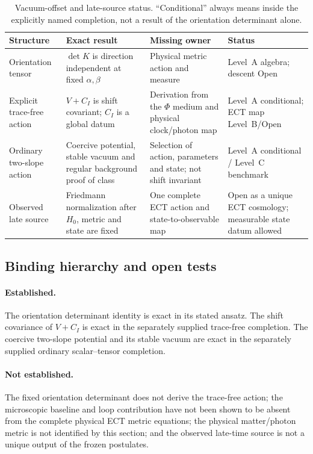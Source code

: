 {\small
\begin{longtable}{p{3.1cm}p{3.7cm}p{3.6cm}p{3.7cm}}
\caption{Vacuum-offset and late-source status.  ``Conditional'' always means
inside the explicitly named completion, not a result of the orientation
determinant alone.}
\label{tab:cc_approaches}\\
\toprule
\textbf{Structure} & \textbf{Exact result} &
\textbf{Missing owner} & \textbf{Status}\\
\midrule
Orientation tensor & $\det K$ is direction independent at fixed
$\alpha,\beta$ & Physical metric action and measure & Level~A algebra;
descent Open\\
Explicit trace-free action & $V\!+\!C_I$ is shift covariant; $C_I$ is a
global datum & Derivation from the $\Phi$ medium and physical clock/photon
map & Level~A conditional; ECT map Level~B/Open\\
Ordinary two-slope action & Coercive potential, stable vacuum and regular
background proof of class & Selection of action, parameters and state;
not shift invariant & Level~A conditional / Level~C benchmark\\
Observed late source & Friedmann normalization after $H_0$, metric and state
are fixed & One complete ECT action and state-to-observable map & Open as a
unique ECT cosmology; measurable state datum allowed\\
\bottomrule
\end{longtable}}

\subsection{Binding hierarchy and open tests}
\label{subsec:levels_cc}

\paragraph{Established.}
The orientation determinant identity is exact in its stated ansatz.  The
shift covariance of $V+C_I$ is exact in the separately supplied trace-free
completion.  The coercive two-slope potential and its stable vacuum are
exact in the separately supplied ordinary scalar--tensor completion.

\paragraph{Not established.}
The fixed orientation determinant does not derive the trace-free action;
the microscopic baseline and loop contribution have not been shown to be
absent from the complete physical ECT metric equations; the physical
matter/photon metric is not identified by this section; and the observed
late-time source is not a unique output of the frozen postulates.

